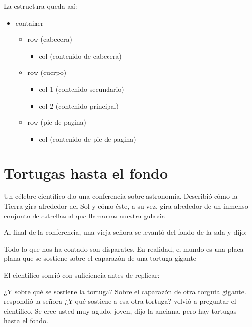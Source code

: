 \documentclass[letterpaper,10pt,spanish]{sphinxmanual}
\begin{document}
La estructura queda así:
\begin{itemize}
\item {} 
container
\begin{itemize}
\item {} 
row (cabecera)
\begin{itemize}
\item {} 
col (contenido de cabecera)

\end{itemize}

\item {} 
row (cuerpo)
\begin{itemize}
\item {} 
col 1 (contenido secundario)

\item {} 
col 2 (contenido principal)

\end{itemize}

\item {} 
row (pie de pagina)
\begin{itemize}
\item {} 
col (contenido de pie de pagina)

\end{itemize}

\end{itemize}

\end{itemize}


\section{Tortugas hasta el fondo}
\label{\detokenize{filas-columnas:tortugas-hasta-el-fondo}}
%
\begin{sphinxVerbatim}[commandchars=\\\{\}]
Un célebre científico dio una conferencia sobre astronomía.
Describió cómo la Tierra gira alrededor del Sol y cómo éste, a su vez,
gira alrededor de un inmenso conjunto de estrellas al que llamamos nuestra galaxia.

Al final de la conferencia, una vieja señora se levantó del fondo de la sala y dijo:

\PYGZhy{} Todo lo que nos ha contado son disparates.
  En realidad, el mundo es una placa plana que se sostiene sobre el caparazón
  de una tortuga gigante

El científico sonrió con suficiencia antes de replicar:

\PYGZhy{} ¿Y sobre qué se sostiene la tortuga?
\PYGZhy{} Sobre el caparazón de otra torguta gigante. \PYGZhy{}respondió la señora
\PYGZhy{} ¿Y qué sostiene a esa otra tortuga? volvió a preguntar el científico.
\PYGZhy{} Se cree usted muy agudo, joven, dijo la anciana,
  pero hay tortugas hasta el fondo.
\end{sphinxVerbatim}
\end{document}
